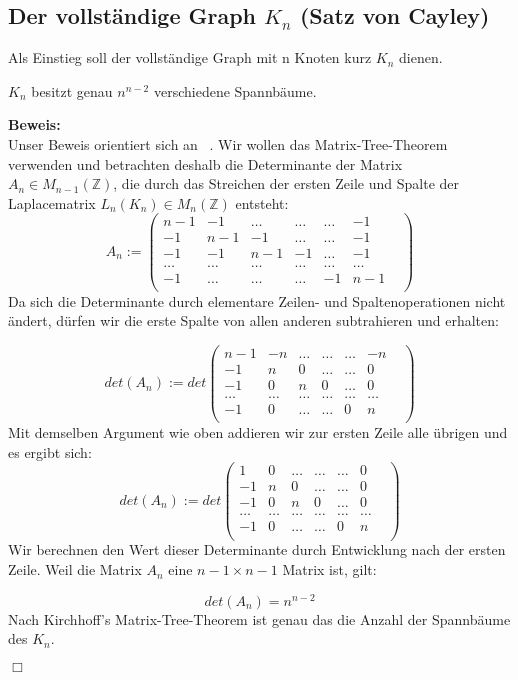 \graphicspath{{grafiken/}}

\subsection{Der vollständige Graph $K_n$ (Satz von Cayley)}

Als Einstieg soll der vollständige Graph mit n Knoten kurz $K_n$ dienen.\\%
\begin{Tms}
$K_n$ besitzt genau $n^{n-2}$ verschiedene Spannbäume.\\
\end{Tms}
\textbf{Beweis:}\\
Unser Beweis orientiert sich an ~\cite{Lau_2004}.
Wir wollen das Matrix-Tree-Theorem verwenden und betrachten deshalb die Determinante der Matrix $A_n\in M_{n-1}(\mathbb{Z})$, die durch das Streichen der ersten Zeile und Spalte der Laplacematrix $L_n(K_n)\in M_n(\mathbb{Z})$ entsteht:
\begin{equation}
A_n:=
\begin{pmatrix}
n-1&-1&\ldots&\ldots&\ldots&-1\\
-1&n-1&-1&\ldots&\ldots&-1\\
-1&-1&n-1&-1&\ldots&-1\\
\ldots&\ldots&\ldots&\ldots&\ldots&\ldots&\\
-1&\ldots&\ldots&\ldots&-1&n-1\\
\end{pmatrix}
\end{equation}
Da sich die Determinante durch elementare Zeilen- und Spaltenoperationen nicht ändert, dürfen wir die erste Spalte von allen anderen subtrahieren und erhalten:

\begin{equation}
det(A_n):=det
\begin{pmatrix}
n-1&-n&\ldots&\ldots&\ldots&-n\\
-1&n&0&\ldots&\ldots&0\\
-1&0&n&0&\ldots&0\\
\ldots&\ldots&\ldots&\ldots&\ldots&\ldots&\\
-1&0&\ldots&\ldots&0&n\\
\end{pmatrix}
\end{equation}
Mit demselben Argument wie oben addieren wir zur ersten Zeile alle übrigen und es ergibt sich:
\begin{equation}
det(A_n):=det
\begin{pmatrix}
1&0&\ldots&\ldots&\ldots&0\\
-1&n&0&\ldots&\ldots&0\\
-1&0&n&0&\ldots&0\\
\ldots&\ldots&\ldots&\ldots&\ldots&\ldots&\\
-1&0&\ldots&\ldots&0&n\\
\end{pmatrix}
\end{equation}
Wir berechnen den Wert dieser Determinante durch Entwicklung nach der ersten Zeile. Weil die Matrix $A_n$ eine $n-1 \times n-1$ Matrix ist, gilt:

\begin{equation}
 det(A_n)=n^{n-2}
\end{equation}
Nach Kirchhoff's Matrix-Tree-Theorem ist genau das die Anzahl der Spannbäume des $K_n$.
\begin{flushright} $\Box$ \end{flushright} 
